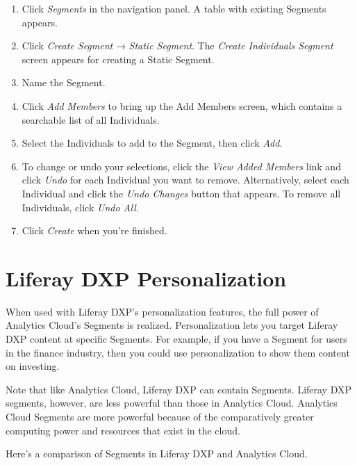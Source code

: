 \begin{enumerate}
\def\labelenumi{\arabic{enumi}.}
\item
  Click \emph{Segments} in the navigation panel. A table with existing
  Segments appears.
\item
  Click \emph{Create Segment} → \emph{Static Segment}. The \emph{Create
  Individuals Segment} screen appears for creating a Static Segment.
\item
  Name the Segment.
\item
  Click \emph{Add Members} to bring up the Add Members screen, which
  contains a searchable list of all Individuals.
\item
  Select the Individuals to add to the Segment, then click \emph{Add}.
\item
  To change or undo your selections, click the \emph{View Added Members}
  link and click \emph{Undo} for each Individual you want to remove.
  Alternatively, select each Individual and click the \emph{Undo
  Changes} button that appears. To remove all Individuals, click
  \emph{Undo All}.
\item
  Click \emph{Create} when you're finished.
\end{enumerate}

\section{Liferay DXP Personalization}\label{liferay-dxp-personalization}

When used with Liferay DXP's personalization features, the full power of
Analytics Cloud's Segments is realized. Personalization lets you target
Liferay DXP content at specific Segments. For example, if you have a
Segment for users in the finance industry, then you could use
personalization to show them content on investing.

Note that like Analytics Cloud, Liferay DXP can contain Segments.
Liferay DXP segments, however, are less powerful than those in Analytics
Cloud. Analytics Cloud Segments are more powerful because of the
comparatively greater computing power and resources that exist in the
cloud.

Here's a comparison of Segments in Liferay DXP and Analytics Cloud.

\noindent\hrulefill

